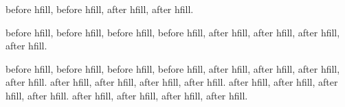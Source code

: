 \documentclass[14pt]{extreport}
\begin{document}
before hfill, before hfill,
\hfill
after hfill, after hfill.

\flushbottom

before hfill, before hfill, before hfill, before hfill,
\hfill
after hfill, after hfill, after hfill, after hfill.

before hfill, before hfill, before hfill, before hfill,
\hfill
after hfill, after hfill, after hfill, after hfill.
after hfill, after hfill, after hfill, after hfill.
after hfill, after hfill, after hfill, after hfill.
after hfill, after hfill, after hfill, after hfill.
\end{document}
